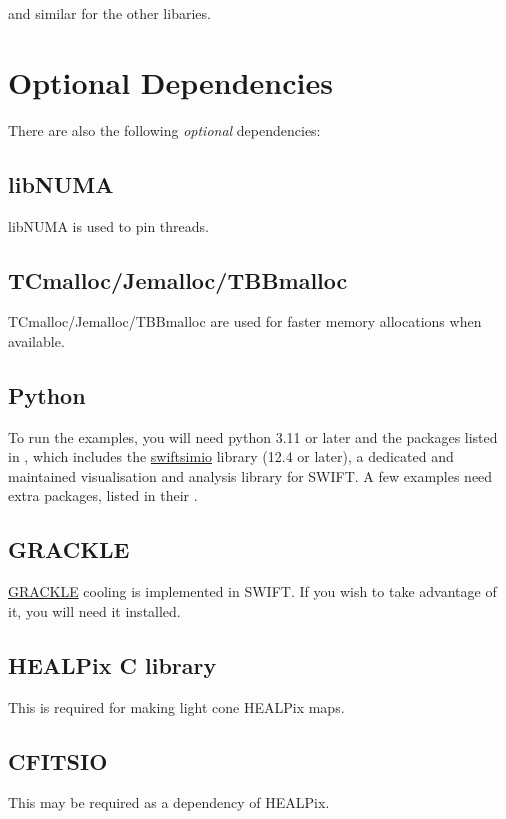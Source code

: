 and similar for the other libaries.



\section{Optional Dependencies}

There are also the following \emph{optional} dependencies:


\subsection{libNUMA}

libNUMA is used to pin threads.


\subsection{TCmalloc/Jemalloc/TBBmalloc}

TCmalloc/Jemalloc/TBBmalloc are used for faster memory allocations when
available.


\subsection{Python}

To run the examples, you will need python 3.11 or later and the packages
listed in , which includes the
\href{https://swiftsimio.readthedocs.io/en/latest/}{swiftsimio} library
(12.4 or later), a dedicated and maintained visualisation and analysis library
for SWIFT. A few examples need extra packages, listed in their
.


\subsection{GRACKLE}

\href{https://github.com/mladenivkovic/grackle-swift}{GRACKLE} cooling is
implemented in SWIFT. If you wish to take advantage of it, you will need it
installed.


\subsection{HEALPix C library}

This is required for making light cone HEALPix maps. 


\subsection{CFITSIO}

This may be required as a dependency of HEALPix.



